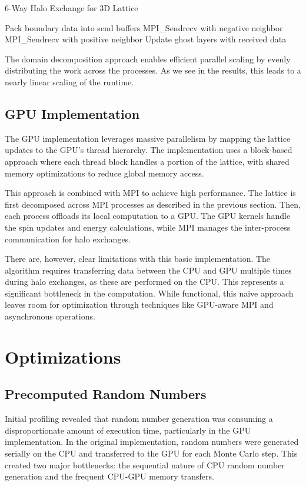 \documentclass{article}
\begin{document}
\begin{algorithm}[H]
\caption{6-Way Halo Exchange for 3D Lattice}
\begin{algorithmic}[1]
\State Pack boundary data into send buffers
    \State MPI\_Sendrecv with negative neighbor
    \State MPI\_Sendrecv with positive neighbor
\EndFor
\State Update ghost layers with received data
\end{algorithmic}
\end{algorithm}

The domain decomposition approach enables efficient parallel scaling by evenly distributing the work across the processes. As we see in the results, this leads to a nearly linear scaling of the runtime.


\subsection{GPU Implementation}
The GPU implementation leverages massive parallelism by mapping the lattice updates to the GPU's thread hierarchy. The implementation uses a block-based approach where each thread block handles a portion of the lattice, with shared memory optimizations to reduce global memory access.

This approach is combined with MPI to achieve high performance. The lattice is first decomposed across MPI processes as described in the previous section. Then, each process offloads its local computation to a GPU. The GPU kernels handle the spin updates and energy calculations, while MPI manages the inter-process communication for halo exchanges.

There are, however, clear limitations with this basic implementation. The algorithm requires transferring data between the CPU and GPU multiple times during halo exchanges, as these are performed on the CPU. This represents a significant bottleneck in the computation. While functional, this naive approach leaves room for optimization through techniques like GPU-aware MPI and asynchronous operations.

\section{Optimizations}
\subsection{Precomputed Random Numbers}
Initial profiling revealed that random number generation was consuming a disproportionate amount of execution time, particularly in the GPU implementation. In the original implementation, random numbers were generated serially on the CPU and transferred to the GPU for each Monte Carlo step. This created two major bottlenecks: the sequential nature of CPU random number generation and the frequent CPU-GPU memory transfers.
\end{document}
